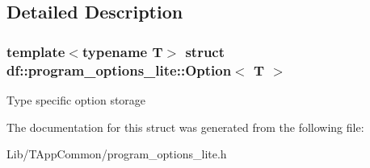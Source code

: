 \subsection{Detailed Description}
\subsubsection*{template$<$typename T$>$\newline
struct df\+::program\+\_\+options\+\_\+lite\+::\+Option$<$ T $>$}

Type specific option storage 

The documentation for this struct was generated from the following file\+:\begin{DoxyCompactItemize}
\item 
Lib/\+T\+App\+Common/program\+\_\+options\+\_\+lite.\+h\end{DoxyCompactItemize}
